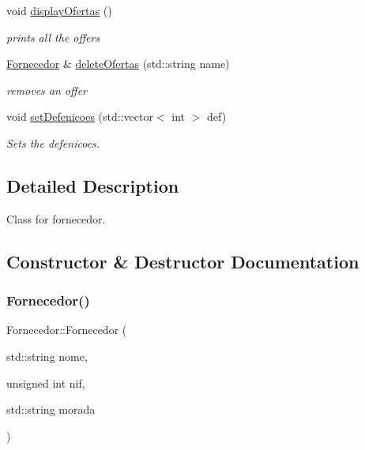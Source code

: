 \begin{DoxyCompactItemize}
\mbox{\label{classFornecedor_a858875f921d2eebb652c4b7628f95c71}} 
void \hyperlink{classFornecedor_a858875f921d2eebb652c4b7628f95c71}{display\+Ofertas} ()
\begin{DoxyCompactList}\small\item\em prints all the offers \end{DoxyCompactList}\item 
\hyperlink{classFornecedor}{Fornecedor} \& \hyperlink{classFornecedor_a55df81a932be74bc25122639c64ab5a0}{delete\+Ofertas} (std\+::string name)
\begin{DoxyCompactList}\small\item\em removes an offer \end{DoxyCompactList}\item 
void \hyperlink{classFornecedor_a63bb5795c45d195995de437620503d98}{set\+Defenicoes} (std\+::vector$<$ int $>$ def)
\begin{DoxyCompactList}\small\item\em Sets the defenicoes. \end{DoxyCompactList}\end{DoxyCompactItemize}


\subsection{Detailed Description}
Class for fornecedor. 

\subsection{Constructor \& Destructor Documentation}
\mbox{\label{classFornecedor_a0cbc4556289cc946756039ab0da52756}} 
\subsubsection{\texorpdfstring{Fornecedor()}{Fornecedor()}}
{\footnotesize\ttfamily Fornecedor\+::\+Fornecedor (\begin{DoxyParamCaption}\item[{std\+::string}]{nome,  }\item[{unsigned int}]{nif,  }\item[{std\+::string}]{morada }\end{DoxyParamCaption})}



